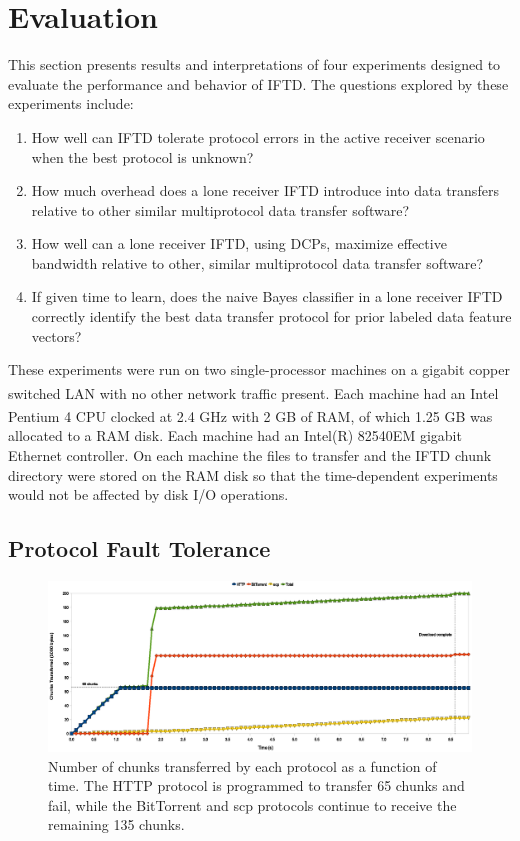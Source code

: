 \section{Evaluation}

This section presents results and interpretations of four experiments designed to evaluate the performance and behavior of IFTD.  The questions explored by these experiments include:
\begin{enumerate}
\item How well can IFTD tolerate protocol errors in the active receiver scenario when the best protocol is unknown?
\item How much overhead does a lone receiver IFTD introduce into data transfers relative to other similar multiprotocol data transfer software?
\item How well can a lone receiver IFTD, using DCPs, maximize effective bandwidth relative to other, similar multiprotocol data transfer software?
\item If given time to learn, does the naive Bayes classifier in a lone receiver IFTD correctly identify the best data transfer protocol for prior labeled data feature vectors?
\end{enumerate}

These experiments were run on two single-processor machines on a gigabit copper switched LAN with no other network traffic present.  Each machine had an Intel\textsuperscript{\textregistered} Pentium\textsuperscript{\textregistered} 4 CPU clocked at 2.4 GHz with 2 GB of RAM, of which 1.25 GB was allocated to a RAM disk.  Each machine had an Intel(R) 82540EM gigabit Ethernet controller.  On each machine the files to transfer and the IFTD chunk directory were stored on the RAM disk so that the time-dependent experiments would not be affected by disk I/O operations.

\subsection{Protocol Fault Tolerance}

\begin{figure}[h!]
    \centering
    \includegraphics[width=1.0\textwidth]{diagrams/protocol-fault-toleration}
    \caption{Number of chunks transferred by each protocol as a function of time.  The HTTP protocol is programmed to transfer 65 chunks and fail, while the BitTorrent and scp protocols continue to receive the remaining 135 chunks.}
    \label{protocol-fault-toleration}
\end{figure}

